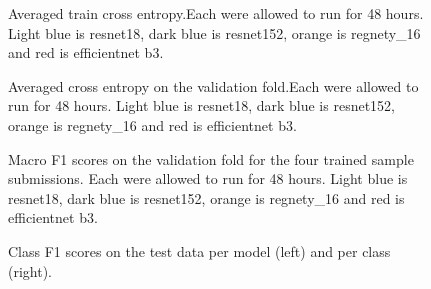 \documentclass{article}
\begin{document}
\begin{figure}
	\centering
	\def\svgwidth{0.5\columnwidth}
	
	\caption{\label{fig:sample_submission_train_CE}Averaged train cross entropy.Each were allowed to run for 48 hours. Light blue is resnet18, dark blue is resnet152, orange is regnety\_16 and red is efficientnet b3. }
\end{figure}
\begin{figure}
	\centering
	\def\svgwidth{0.5\columnwidth}
	
	\caption{\label{fig:sample_submission_valid_CE}Averaged cross entropy on the validation fold.Each were allowed to run for 48 hours. Light blue is resnet18, dark blue is resnet152, orange is regnety\_16 and red is efficientnet b3. }
\end{figure}

\begin{figure}
	\centering
	\def\svgwidth{0.5\columnwidth}
	
	\caption{\label{fig:sample_submission_test_F1}Macro F1 scores on the validation fold for the four trained sample submissions. Each were allowed to run for 48 hours. Light blue is resnet18, dark blue is resnet152, orange is regnety\_16 and red is efficientnet b3. }
\end{figure}



\begin{figure}[htbp]
	\begin{center}
		\hspace*{.4in}
	\end{center}
	\caption{\label{fig:class_team_score_sample} Class F1 scores on the test data per model (left) and per class (right).}
\end{figure}
\end{document}
